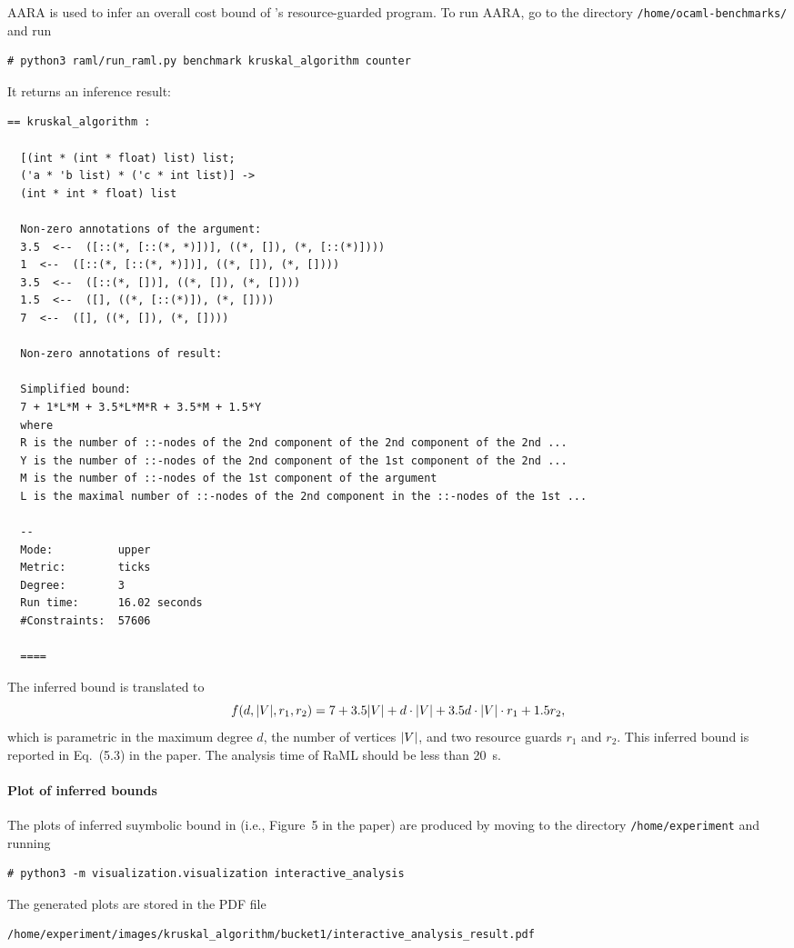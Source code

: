 AARA is used to infer an overall cost bound of \kruskal{}'s resource-guarded
program.
%
To run AARA, go to the directory \texttt{/home/ocaml-benchmarks/} and run
\begin{verbatim}
# python3 raml/run_raml.py benchmark kruskal_algorithm counter
\end{verbatim}
%
It returns an inference result:
\begin{Verbatim}[fontsize=\footnotesize]
  == kruskal_algorithm :

  [(int * (int * float) list) list;
  ('a * 'b list) * ('c * int list)] ->
  (int * int * float) list

  Non-zero annotations of the argument:
  3.5  <--  ([::(*, [::(*, *)])], ((*, []), (*, [::(*)])))
  1  <--  ([::(*, [::(*, *)])], ((*, []), (*, [])))
  3.5  <--  ([::(*, [])], ((*, []), (*, [])))
  1.5  <--  ([], ((*, [::(*)]), (*, [])))
  7  <--  ([], ((*, []), (*, [])))

  Non-zero annotations of result:

  Simplified bound:
  7 + 1*L*M + 3.5*L*M*R + 3.5*M + 1.5*Y
  where
  R is the number of ::-nodes of the 2nd component of the 2nd component of the 2nd ...
  Y is the number of ::-nodes of the 2nd component of the 1st component of the 2nd ...
  M is the number of ::-nodes of the 1st component of the argument
  L is the maximal number of ::-nodes of the 2nd component in the ::-nodes of the 1st ...

  --
  Mode:          upper
  Metric:        ticks
  Degree:        3
  Run time:      16.02 seconds
  #Constraints:  57606

  ====
\end{Verbatim}
%
The inferred bound is translated to
\begin{equation}
  f (d, |{V}|, r_1, r_2) = 7 + 3.5 |{V}| + d \cdot |{V}| + 3.5 d \cdot |{V}| \cdot r_1 + 1.5 r_2,
\end{equation}
which is parametric in the maximum degree $d$, the number of vertices $|{V}|$,
and two resource guards $r_1$ and $r_2$.
%
This inferred bound is reported in Eq.~(5.3) in the paper.
%
The analysis time of RaML should be less than \qty{20}{\second}.

\paragraph{Plot of inferred bounds}

The plots of inferred suymbolic bound in \kruskal{} (i.e., Figure~5 in the
paper) are produced by moving to the directory \texttt{/home/experiment} and
running
\begin{verbatim}
# python3 -m visualization.visualization interactive_analysis
\end{verbatim}
%
The generated plots are stored in the PDF file
\begin{verbatim}
/home/experiment/images/kruskal_algorithm/bucket1/interactive_analysis_result.pdf
\end{verbatim}

